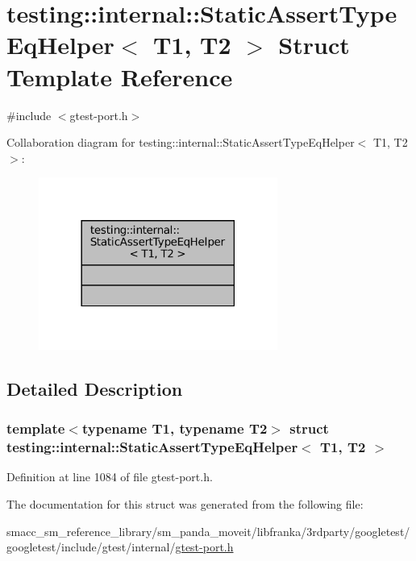 \hypertarget{structtesting_1_1internal_1_1StaticAssertTypeEqHelper}{}\section{testing\+:\+:internal\+:\+:Static\+Assert\+Type\+Eq\+Helper$<$ T1, T2 $>$ Struct Template Reference}
\label{structtesting_1_1internal_1_1StaticAssertTypeEqHelper}


{\ttfamily \#include $<$gtest-\/port.\+h$>$}



Collaboration diagram for testing\+:\+:internal\+:\+:Static\+Assert\+Type\+Eq\+Helper$<$ T1, T2 $>$\+:
\nopagebreak
\begin{figure}[H]
\begin{center}
\leavevmode
\includegraphics[width=222pt]{structtesting_1_1internal_1_1StaticAssertTypeEqHelper__coll__graph}
\end{center}
\end{figure}


\subsection{Detailed Description}
\subsubsection*{template$<$typename T1, typename T2$>$\newline
struct testing\+::internal\+::\+Static\+Assert\+Type\+Eq\+Helper$<$ T1, T2 $>$}



Definition at line 1084 of file gtest-\/port.\+h.



The documentation for this struct was generated from the following file\+:\begin{DoxyCompactItemize}
\item 
smacc\+\_\+sm\+\_\+reference\+\_\+library/sm\+\_\+panda\+\_\+moveit/libfranka/3rdparty/googletest/googletest/include/gtest/internal/\hyperlink{gtest-port_8h}{gtest-\/port.\+h}\end{DoxyCompactItemize}
